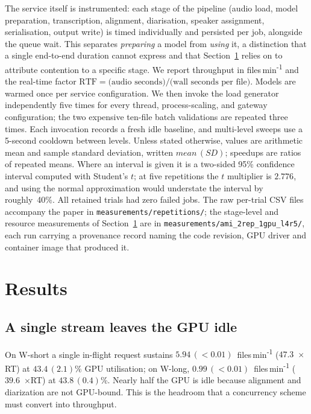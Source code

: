 \documentclass[10pt]{article}
\newcommand{\filesmin}{files\,min\textsuperscript{-1}}
\newcommand{\rtf}{$\times$RT}
\newcommand{\msd}[2]{$#1\,(#2)$}
\begin{document}
The service itself is instrumented: each stage of the pipeline
(audio load, model preparation, transcription, alignment, diarisation, speaker
assignment, serialisation, output write) is timed individually and persisted
per job, alongside the queue wait. This separates \emph{preparing} a model from
\emph{using} it, a distinction that a single end-to-end duration cannot express
and that Section~\ref{sec:results} relies on to attribute contention to a
specific stage. We report throughput in
files\,min\textsuperscript{-1} and the real-time factor
$\mathrm{RTF}=\text{(audio seconds)}/\text{(wall seconds per file)}$. Models are
warmed once per service configuration. We then invoke the load generator
independently five times for every thread, process-scaling, and gateway
configuration; the two expensive ten-file batch validations are repeated three
times. Each invocation records a fresh idle baseline, and multi-level
sweeps use a 5-second cooldown between levels. Unless stated otherwise, values
are arithmetic mean and sample standard deviation, written
\msd{mean}{SD}; speedups are ratios of repeated means. Where an interval is
given it is a two-sided 95\% confidence interval computed with Student's $t$;
at five repetitions the $t$ multiplier is $2.776$, and using the normal
approximation would understate the interval by roughly~40\%. All retained
trials had zero failed jobs. The raw per-trial CSV files accompany the paper in
\texttt{measurements/repetitions/}; the stage-level and resource measurements
of Section~\ref{sec:results} are in \texttt{measurements/ami\_2rep\_1gpu\_l4r5/},
each run carrying a provenance record naming the code revision, GPU driver and
container image that produced it.

\section{Results}
\label{sec:results}

\subsection{A single stream leaves the GPU idle}
On W-short a single in-flight request sustains
\msd{5.94}{<0.01}~\filesmin{} ($47.3$~\rtf) at
\msd{43.4}{2.1}\% GPU utilisation; on W-long,
\msd{0.99}{<0.01}~\filesmin{} ($39.6$~\rtf) at
\msd{43.8}{0.4}\%. Nearly half the GPU is idle
because alignment and diarization are not GPU-bound. This is the headroom that a
concurrency scheme must convert into throughput.
\end{document}

